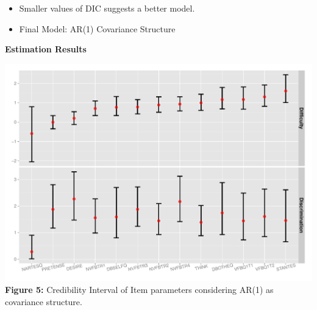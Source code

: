 \documentclass[portrait,final,archD,fontscale=0.477]{baposter}
\begin{document}
\begin{poster}
{\begin{multicols}{2}
\begin{itemize}
\item Smaller values of DIC suggests a better model.
\vspace{-0.5em}
\item Final Model: AR(1) Covariance Structure
\end{itemize}

\columnbreak

\textbf{Estimation Results} 
\vspace{-1em}
\begin{table}[H]
\centering
\caption{Summary of $\rho$ estimate}
\label{table_rho}
\end{table}
\vspace{-2em}
\begin{center}
\includegraphics[trim=0cm 0.5cm 0cm 1cm,clip,scale=0.3]{./images-posterlatinr/diff_disc_AR1}
\textbf{Figure 5:} Credibility Interval of Item parameters considering AR(1) as covariance structure.
\end{center}


\end{multicols}}
\end{poster}
\end{document}
